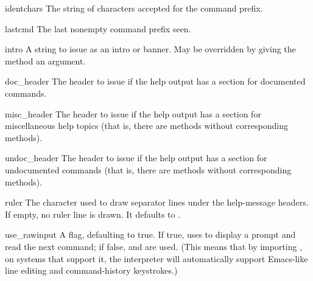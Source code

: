 \begin{memberdesc}{identchars}
The string of characters accepted for the command prefix.
\end{memberdesc}

\begin{memberdesc}{lastcmd}
The last nonempty command prefix seen. 
\end{memberdesc}

\begin{memberdesc}{intro}
A string to issue as an intro or banner.  May be overridden by giving
the  method an argument.
\end{memberdesc}

\begin{memberdesc}{doc_header}
The header to issue if the help output has a section for documented
commands.
\end{memberdesc}

\begin{memberdesc}{misc_header}
The header to issue if the help output has a section for miscellaneous 
help topics (that is, there are  methods without
corresponding  methods).
\end{memberdesc}

\begin{memberdesc}{undoc_header}
The header to issue if the help output has a section for undocumented 
commands (that is, there are  methods without
corresponding  methods).
\end{memberdesc}

\begin{memberdesc}{ruler}
The character used to draw separator lines under the help-message
headers.  If empty, no ruler line is drawn.  It defaults to
\character{=}.
\end{memberdesc}

\begin{memberdesc}{use_rawinput}
A flag, defaulting to true.  If true,  uses
 to display a prompt and read the next command;
if false,  and
 are used. (This means that by
importing , on systems that support it, the
interpreter will automatically support Emacs-like line editing 
and command-history keystrokes.)
\end{memberdesc}

